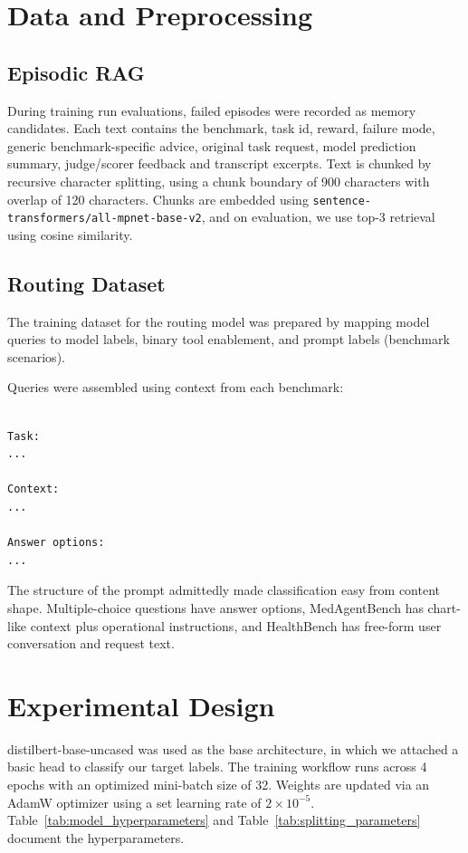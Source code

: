 \documentclass[conference]{IEEEtran}
\begin{document}
\section{Data and Preprocessing}

\subsection{Episodic RAG}

During training run evaluations, failed episodes were recorded as memory candidates. Each text contains the benchmark, task id, reward, failure mode, generic benchmark-specific advice, original task request, model prediction summary, judge/scorer feedback and transcript excerpts. Text is chunked by recursive character splitting, using a chunk boundary of 900 characters with overlap of 120 characters. Chunks are embedded using \texttt{sentence-transformers/all-mpnet-base-v2}, and on evaluation, we use top-3 retrieval using cosine similarity.

\subsection{Routing Dataset}

The training dataset for the routing model was prepared by mapping model queries to model labels, binary tool enablement, and prompt labels (benchmark scenarios).  

Queries were assembled using context from each benchmark:

\begin{lstlisting}[language=python, caption={Prompt assembly}, label=lst:not-available]

Task:
...

Context:
...

Answer options:
...

\end{lstlisting}

The structure of the prompt admittedly made classification easy from content shape. Multiple-choice questions have answer options, MedAgentBench has chart-like context plus operational instructions, and HealthBench has free-form user conversation and request text.

\section{Experimental Design}

distilbert-base-uncased was used as the base architecture, in which we attached a basic head to classify our target labels. The training workflow runs across 4 epochs with an optimized mini-batch size of 32. Weights are updated via an AdamW optimizer using a set learning rate of $2\times10^{-5}$. Table~\ref{tab:model_hyperparameters} and Table~\ref{tab:splitting_parameters} document the hyperparameters.
\end{document}
